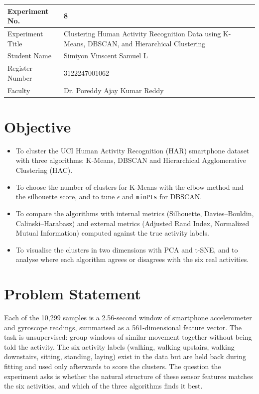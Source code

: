 \documentclass[12pt,a4paper]{article}
\begin{document}
\begin{tabular}{|p{4cm}|p{11cm}|}
\hline
Experiment No. & 8 \\ \hline
Experiment Title & Clustering Human Activity Recognition Data using K-Means, DBSCAN, and
Hierarchical Clustering\footnotemark\\ \hline
Student Name & Simiyon Vinscent Samuel L \\ \hline
Register Number & 3122247001062 \\ \hline
Faculty & Dr. Poreddy Ajay Kumar Reddy \\ \hline
\end{tabular}

\section{Objective}
\begin{itemize}[nosep]
\item To cluster the UCI Human Activity Recognition (HAR) smartphone dataset with three
algorithms: K-Means, DBSCAN and Hierarchical Agglomerative Clustering (HAC).
\item To choose the number of clusters for K-Means with the elbow method and the silhouette
score, and to tune $\epsilon$ and \texttt{minPts} for DBSCAN.
\item To compare the algorithms with internal metrics (Silhouette, Davies--Bouldin,
Calinski--Harabasz) and external metrics (Adjusted Rand Index, Normalized Mutual Information)
computed against the true activity labels.
\item To visualise the clusters in two dimensions with PCA and t-SNE, and to analyse where each
algorithm agrees or disagrees with the six real activities.
\end{itemize}

\section{Problem Statement}
Each of the 10,299 samples is a 2.56-second window of smartphone accelerometer and gyroscope
readings, summarised as a 561-dimensional feature vector. The task is unsupervised: group
windows of similar movement together without being told the activity. The six activity labels
(walking, walking upstairs, walking downstairs, sitting, standing, laying) exist in the data
but are held back during fitting and used only afterwards to score the clusters. The question
the experiment asks is whether the natural structure of these sensor features matches the six
activities, and which of the three algorithms finds it best.
\end{document}
